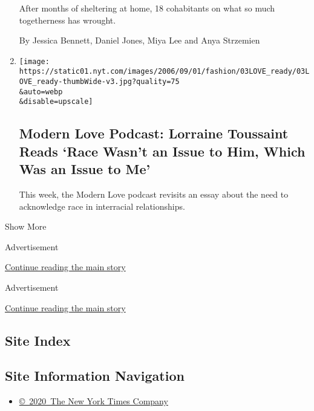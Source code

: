 \begin{enumerate}
  After months of sheltering at home, 18 cohabitants on what so much
  togetherness has wrought.

  By Jessica Bennett, Daniel Jones, Miya Lee and Anya Strzemien
\item
  \href{/2020/06/10/style/modern-love-podcast-lorraine-toussant-updated-poscript.html}{}

  \texttt{[image: https://static01.nyt.com/images/2006/09/01/fashion/03LOVE\_ready/03LOVE\_ready-thumbWide-v3.jpg?quality=75\\\&auto=webp\\\&disable=upscale]}

  \hypertarget{modern-love-podcast-lorraine-toussaint-reads-race-wasnt-an-issue-to-him-which-was-an-issue-to-me}{%
  \subsection{Modern Love Podcast: Lorraine Toussaint Reads `Race Wasn't
  an Issue to Him, Which Was an Issue to
  Me'}\label{modern-love-podcast-lorraine-toussaint-reads-race-wasnt-an-issue-to-him-which-was-an-issue-to-me}}

  This week, the Modern Love podcast revisits an essay about the need to
  acknowledge race in interracial relationships.
\end{enumerate}

Show More

Advertisement

\protect\hyperlink{after-mid2}{Continue reading the main story}

Advertisement

\protect\hyperlink{after-mktg}{Continue reading the main story}

\hypertarget{site-index}{%
\subsection{Site Index}\label{site-index}}

\hypertarget{site-information-navigation}{%
\subsection{Site Information
Navigation}\label{site-information-navigation}}

\begin{itemize}
\tightlist
\item
  \href{https://help.nytimes.com/hc/en-us/articles/115014792127-Copyright-notice}{©~2020~The
  New York Times Company}
\end{itemize}

